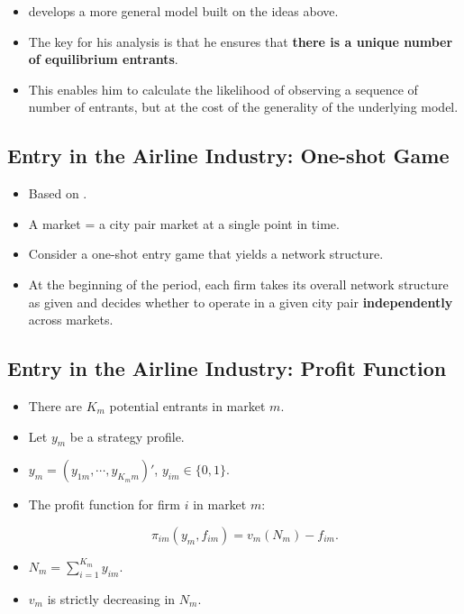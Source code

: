\documentclass[]{book}
\providecommand{\tightlist}{%
  \setlength{\itemsep}{0pt}\setlength{\parskip}{0pt}}
\begin{document}
\begin{itemize}
\tightlist
\item
  \citet{berryEstimationModelEntry1992} develops a more general model
  built on the ideas above.
\item
  The key for his analysis is that he ensures that \textbf{there is a
  unique number of equilibrium entrants}.
\item
  This enables him to calculate the likelihood of observing a sequence
  of number of entrants, but at the cost of the generality of the
  underlying model.
\end{itemize}

\subsection{Entry in the Airline Industry: One-shot
Game}\label{entry-in-the-airline-industry-one-shot-game}

\begin{itemize}
\tightlist
\item
  Based on \citet{berryEstimationModelEntry1992}.
\item
  A market = a city pair market at a single point in time.
\item
  Consider a one-shot entry game that yields a network structure.
\item
  At the beginning of the period, each firm takes its overall network
  structure as given and decides whether to operate in a given city pair
  \textbf{independently} across markets.
\end{itemize}

\subsection{Entry in the Airline Industry: Profit
Function}\label{entry-in-the-airline-industry-profit-function}

\begin{itemize}
\tightlist
\item
  There are \(K_m\) potential entrants in market \(m\).
\item
  Let \(y_m\) be a strategy profile.
\item
  \(y_m = (y_{1m}, \cdots, y_{K_m m})'\), \(y_{im} \in \{0, 1\}\).
\item
  The profit function for firm \(i\) in market \(m\):

  \begin{equation}
  \pi_{im}(y_m, f_{im}) = v_m\left(N_{m}\right) - f_{im}.
  \end{equation}
\item
  \(N_{m} = \sum_{i = 1}^{K_m} y_{im}\).
\item
  \(v_m\) is strictly decreasing in \(N_m\).
\end{itemize}
\end{document}
